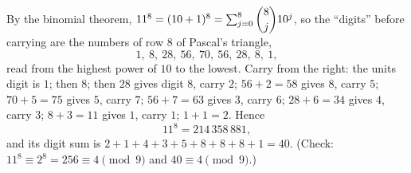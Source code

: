 By the binomial theorem, $11^8=(10+1)^8=\sum_{j=0}^{8}\dbinom8j10^j$, so the ``digits'' before carrying are the numbers of row $8$ of Pascal's triangle,
\[
1,\ 8,\ 28,\ 56,\ 70,\ 56,\ 28,\ 8,\ 1 ,
\]
read from the highest power of $10$ to the lowest. Carry from the right: the units digit is $1$; then $8$; then $28$ gives digit $8$, carry $2$; $56+2=58$ gives $8$, carry $5$; $70+5=75$ gives $5$, carry $7$; $56+7=63$ gives $3$, carry $6$; $28+6=34$ gives $4$, carry $3$; $8+3=11$ gives $1$, carry $1$; $1+1=2$. Hence
\[
11^8=214\,358\,881,
\]
and its digit sum is $2+1+4+3+5+8+8+8+1=\boxed{40}$. (Check: $11^8\equiv2^8=256\equiv4\pmod9$ and $40\equiv4\pmod9$.)
